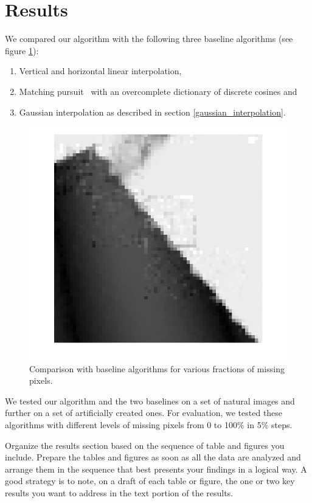 \documentclass[10pt,conference,compsocconf]{IEEEtran}
\begin{document}
\section{Results}
We compared our algorithm with the following three baseline algorithms (see figure \ref{baseline_algorithms}):
\begin{enumerate}
\item Vertical and horizontal linear interpolation,
\item Matching pursuit~\cite{matchingpursuit93} with an overcomplete dictionary of discrete cosines and
\item Gaussian interpolation as described in section \ref{gaussian_interpolation}.
\end{enumerate}

\begin{figure}
\centering
\includegraphics[width=\columnwidth]{images/framing_artifacts.png}
\caption{Comparison with baseline algorithms for various fractions of missing pixels.}
\label{baseline_algorithms}
\end{figure}
 
We tested our algorithm and the two baselines on a set of natural images and further on a set of artificially created ones. 
For evaluation, we tested these algorithms with different levels of missing pixels from 0 to 100\% in 5\% steps.

  
Organize the results section based on the sequence of table and
figures you include. Prepare the tables and figures as soon as all
the data are analyzed and arrange them in the sequence that best
presents your findings in a logical way. A good strategy is to note,
on a draft of each table or figure, the one or two key results you
want to address in the text portion of the results.
\end{document}
